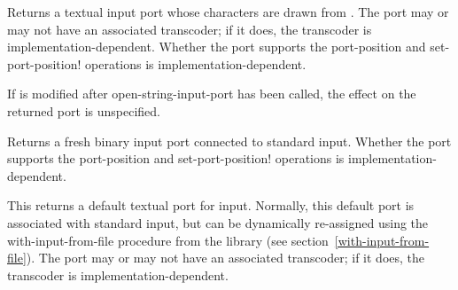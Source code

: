 \begin{entry}{%
}

Returns a textual input port whose characters are drawn from
.  The port may or may not have an associated transcoder;
if it does, the transcoder is implementation-dependent.
Whether the port supports
the {\cf port-position} and {\cf set-port-position!} operations
is implementation-dependent.

If  is modified after {\cf open-string-input-port}
has been called, the effect on the returned port is unspecified.
\end{entry}

\begin{entry}{%
}
   
Returns a fresh binary input port connected to standard input.
Whether the port supports the {\cf port-position} and {\cf
  set-port-position!} operations is implementation-dependent.
\end{entry}

\begin{entry}{%
}
 
This returns a default textual port for input.  Normally, this default port
is associated with standard input, but can be dynamically re-assigned
using the {\cf with-input-from-file} procedure from the
 library (see section~\ref{with-input-from-file}).
The port may or may not have an associated transcoder; if it does, the
transcoder is implementation-dependent.
\end{entry}

